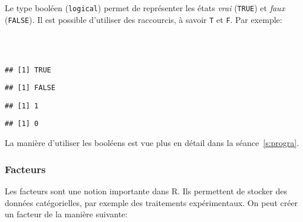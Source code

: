 Le type booléen (\texttt{logical}) permet de représenter les états \emph{vrai} (\texttt{TRUE}) et \emph{faux} (\texttt{FALSE}).
Il est possible d'utiliser des raccourcis, à savoir \texttt{T} et \texttt{F}.
Par exemple:
\begin{knitrout}
\color{fgcolor}\begin{kframe}
\begin{flushleft}
\ttfamily\noindent
{}\hlassignement{\usebox{\hlnormalsizeboxlessthan}-}{\ }\hspace*{\fill}\\
\hlstd{}\hlassignement{\usebox{\hlnormalsizeboxlessthan}-}{\ }\hspace*{\fill}\\
\hlstd{}\mbox{}
\normalfont
\end{flushleft}
\begin{verbatim}
## [1] TRUE
\end{verbatim}
\begin{flushleft}
\ttfamily\noindent
{}\mbox{}
\normalfont
\end{flushleft}
\begin{verbatim}
## [1] FALSE
\end{verbatim}
\begin{flushleft}
\ttfamily\noindent
{}\hlkeyword{+}{\ }\mbox{}
\normalfont
\end{flushleft}
\begin{verbatim}
## [1] 1
\end{verbatim}
\begin{flushleft}
\ttfamily\noindent
{}\hlkeyword{*}{\ }\mbox{}
\normalfont
\end{flushleft}
\begin{verbatim}
## [1] 0
\end{verbatim}
\end{kframe}
\end{knitrout}


La manière d'utiliser les booléens est vue plus en détail dans la séance~\ref{s:progra}.

\subsubsection{Facteurs}

Les facteurs sont une notion importante dans R. Ils permettent de stocker des données catégorielles, par exemple des traitements expérimentaux. On peut créer un facteur de la manière suivante:

